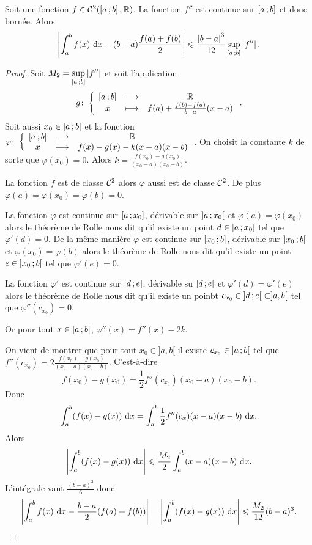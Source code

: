 \begin{lemme}
  Soit une fonction $f \in \mathcal{C}^{2}(\left[ a \, ;  b \right],\mathbb{R})$. La fonction $f''$ est continue sur $\left[ a \, ;  b \right]$ et donc bornée. Alors
  \begin{equation}
    \left\lvert\int_a^bf(x)\,\mathop{}\mathopen{}\mathrm{d} x - (b-a)\frac{f(a)+f(b)}{2}\right\rvert \leqslant \frac{\left\lvert b-a\right\rvert^3}{12} \sup\limits_{\left[ a \, ;  b \right]}\left\lvert f''\right\rvert.
  \end{equation}
\end{lemme}
\begin{proof}
  Soit $M_2=\sup\limits_{\left[ a \, ;  b \right]}\left\lvert f''\right\rvert$ et soit l'application
  \begin{equation}
    g\colon \left\{\begin{array}{ccc} \left[ a \, ;  b \right] & \longrightarrow &\mathbb{R}\\ x & \longmapsto & f(a) + \frac{f(b)-f(a)}{b-a}(x-a) \end{array} \right..
  \end{equation}
  Soit aussi $x_0 \in \left] a \, ;  b \right[$ et la fonction$\varphi\colon \left\{\begin{array}{ccc} \left[ a \, ;  b \right] & \longrightarrow &\mathbb{R}\\ x & \longmapsto & f(x)-g(x)-k(x-a)(x-b) \end{array} \right.$. On choisit la constante $k$ de sorte que $\varphi(x_0)=0$.
  Alors $k=\frac{f(x_0)-g(x_0)}{(x_0-a)(x_0-b)}$.

  La fonction $f$ est de classe $\mathcal{C}^{2}$ alors $\varphi$ aussi est de classe $\mathcal{C}^{2}$. De plus $\varphi(a)=\varphi(x_0)=\varphi(b)=0$.

  La fonction $\varphi$ est continue sur $\left[ a \, ;  x_0 \right]$, dérivable sur $\left] a \, ;  x_0 \right[$ et $\varphi(a)=\varphi(x_0)$ alors le théorème de Rolle nous dit qu'il existe un point $d \in \left] a \, ;  x_0 \right[$ tel que $\varphi'(d)=0$. De la même manière  $\varphi$ est continue sur $\left[ x_0 \, ;  b \right]$, dérivable sur $\left] x_0 \, ;  b \right[$ et $\varphi(x_0)=\varphi(b)$ alors le théorème de Rolle nous dit qu'il existe un point $e \in \left] x_0 \, ;  b \right[$ tel que $\varphi'(e)=0$. 

La fonction $\varphi'$ est continue sur $\left[ d \, ;  e \right]$, dérivable su $\left] d \, ;  e \right[$ et $\varphi'(d)=\varphi'(e)$ alors le théorème de Rolle nous dit qu'il existe un poinbt $c_{x_0} \in \left] d \, ;  e \right[ \subset ]a,b[$ tel que $\varphi''(c_{x_0})=0$. 

Or pour tout $x \in \left[ a \, ;  b \right]$, $\varphi''(x)=f''(x)-2k$.

On vient de montrer que pour tout $x_0 \in ]a,b[$ il existe $c_{x_0} \in \left] a \, ;  b \right[$ tel que $f''(c_{x_0})=2\frac{f(x_0)-g(x_0)}{(x_0-a)(x_0-b)}$. C'est-à-dire
\begin{equation}
  f(x_0)-g(x_0)=\frac{1}{2} f''(c_{x_0})(x_0-a)(x_0-b).
\end{equation}
Donc
\begin{equation}
  \int_a^b (f(x)-g(x))\,\mathop{}\mathopen{}\mathrm{d} x = \int_a^b \frac{1}{2} f''(c_{x})(x-a)(x-b)\,\mathop{}\mathopen{}\mathrm{d} x.
\end{equation}
Alors
\begin{equation}
  \left\lvert\int_a^b (f(x)-g(x))\,\mathop{}\mathopen{}\mathrm{d} x\right\rvert \leqslant \frac{M_2}{2} \int_a^b (x-a)(x-b)\,\mathop{}\mathopen{}\mathrm{d} x.
\end{equation}
L'intégrale vaut $\frac{(b-a)^3}{6}$ donc
\begin{equation}
  \left\lvert\int_a^b f(x)\,\mathop{}\mathopen{}\mathrm{d} x -\frac{b-a}{2}(f(a)+f(b))\right\rvert = \left\lvert\int_a^b (f(x)-g(x))\,\mathop{}\mathopen{}\mathrm{d} x\right\rvert \leqslant \frac{M_2}{12} (b-a)^3.
\end{equation}
\end{proof}


